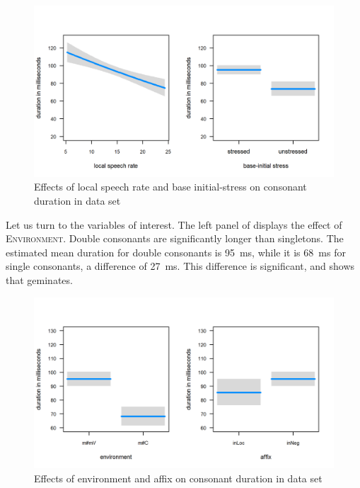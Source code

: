 \begin{figure} [b!]
	\centering
	\vspace*{-0.7cm}
	\includegraphics  [scale=0.8] {images/Corpus/inModelcov.png}
	\caption{Effects of local speech rate and base initial-stress on consonant duration in data set}
	\label{fig:covariates in}
\end{figure}

Let us turn to the variables of interest. The left panel of  displays the effect of \textsc{Environment}. Double consonants are significantly longer than singletons. The estimated mean duration for double consonants is 95~ms, while it is 68~ms for single consonants, a difference of 27~ms. This difference is significant, and shows that  geminates. 







\begin{figure} [t!]
	\centering
	\includegraphics [scale=0.8]  {images/Corpus/inModel.png}
	\caption{Effects of environment and affix on consonant duration in data set}
	\label{fig:inModel}
\end{figure}



